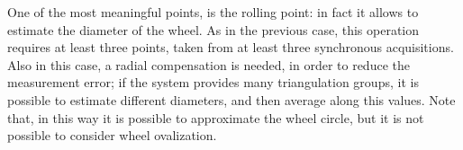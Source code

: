 One of the most meaningful points, is the rolling point: in fact it allows to estimate the diameter of the wheel. As in the previous case, this operation requires at least three points, taken from at least three synchronous acquisitions. Also in this case, a radial compensation is needed, in order to reduce the measurement error; if the system provides many triangulation groups, it is possible to estimate different diameters, and then average along this values. Note that, in this way it is possible to approximate the wheel circle, but it is not possible to consider wheel ovalization.
